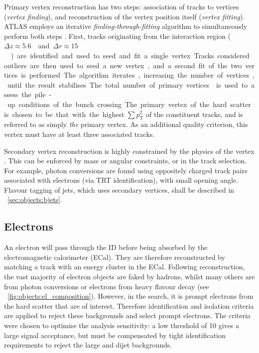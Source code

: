 Primary vertex reconstruction has two steps: association of tracks to vertices 
(\textit{vertex finding}), and reconstruction of the vertex position itself 
(\textit{vertex fitting}). ATLAS employs an iterative \textit{finding-through-fitting} 
algorithm to simultaneously perform both steps \cite{PrimVertexFinding,AllVertexFinding}.
First, tracks originating from the interaction region 
(\unit{$\Delta z \approx 5.6$}{\centi\metre} and 
\unit{$\Delta r \approx 15$}{\micro\metre}) are identified and used to seed and fit a 
single vertex. Tracks considered outliers are then used to seed a new vertex, and a 
second fit of the two vertices is performed. The algorithm iterates, increasing the 
number of vertices, until the result stabilises.

The total number of primary vertices \npv is used to assess the pile-up conditions of 
the bunch crossing. The primary vertex of the hard scatter is chosen to be that with the 
highest $\sum p_{\text{T}}^2$ of the constituent tracks, and is referred to as simply 
\textit{the} primary vertex. As an additional quality criterion, this vertex must have at 
least three associated tracks.

Secondary vertex reconstruction is highly constrained by the physics of the vertex 
\cite{AllVertexFinding}. This can be enforced by mass or angular constraints, or in the 
track selection. For example, photon conversions are found using oppositely charged 
track pairs associated with electrons (via TRT identification), with small 
opening angle. Flavour tagging of jets, which uses secondary vertices, shall be described in 
\Section~\ref{sec:objects:bjets}.



\subsection{Electrons}
\label{sec:objects:electrons}

An electron will pass through the ID before being absorbed by the electromagnetic 
calorimeter (ECal). They 
are therefore reconstructed by matching a track with an energy cluster in the ECal. 
Following reconstruction, the vast majority of electron objects are faked by hadrons, 
whilst many others are from photon conversions or electrons from heavy flavour decay (see 
\Figure~\ref{fig:objects:el_composition}). However, in the \HWWlvlv search, it is prompt 
electrons from the hard scatter that are of interest. Therefore identification and 
isolation criteria are applied to reject these backgrounds and select prompt electrons. 
The criteria were chosen to optimise the analysis sensitivity: \eg a low \et threshold 
of \unit{10}{\GeV} gives a large signal acceptance, but must be compensated by tight 
identification requirements to reject the large \Wjets and dijet backgrounds.

